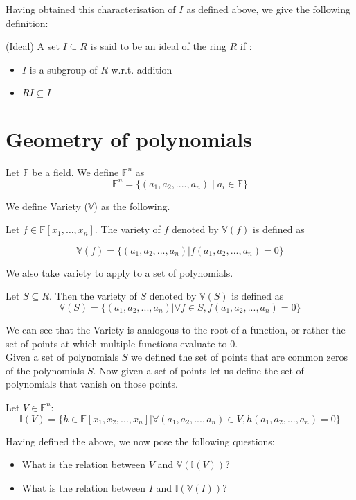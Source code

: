 Having obtained this characterisation of $I$ as defined above, we give the following definition:
\begin{definition} (Ideal)
A set $I\subseteq R$ is said to be an ideal of the ring $R$ if :
\begin{itemize}
\item $I$ is a subgroup of $R$ w.r.t. addition
\item $RI \subseteq I$
\end{itemize}
\end{definition}

\section{Geometry of polynomials}
Let $\mathbb{F}$ be a field. We define $\mathbb{F}^n$ as 
\[
\mathbb{F}^n = \{(a_1,a_2,....,a_n) \mid a_i \in \mathbb{F}\}
\]

We define Variety ($\mathbb{V}$) as the following.

Let $f\in\mathbb{F}[x_1,\dots,x_n]$. The variety of $f$ denoted by $\mathbb{V}(f)$ is defined as

\begin{equation}
\mathbb{V}(f) = \{(a_1,a_2,...,a_n) | f(a_1,a_2,...,a_n)=0\}
\end{equation}

We also take variety to apply to a set of polynomials. 

Let $S \subseteq R$. Then the variety of $S$ denoted by $\mathbb{V}(S)$ is defined as 
\begin{equation}
\mathbb{V}(S) = \{(a_1,a_2,...,a_n) | \forall f \in S, f(a_1,a_2,...,a_n)=0\}
\end{equation}

We can see that the Variety is analogous to the root of a function, or rather the set of points at which multiple functions evaluate to 0.\\

Given a set of polynomials $S$ we defined the set of points that are common zeros of the polynomials $S$. Now given a set of points let us define the set of polynomials that vanish on those points. 



Let $V \in \mathbb{F}^n$:
\begin{equation}
\mathbb{I}(V) = \{h \in \mathbb{F}[x_1,x_2,...,x_n] | \forall (a_1,a_2,...,a_n) \in V, h(a_1,a_2,...,a_n) = 0 \}
\end{equation}


Having defined the above, we now pose the following questions:
\begin{itemize}
\item What is the relation between $V$ and $\mathbb{V}(\mathbb{I}(V))$?
\item What is the relation between $I$ and $\mathbb{I}(\mathbb{V}(I))$?
\end{itemize}









